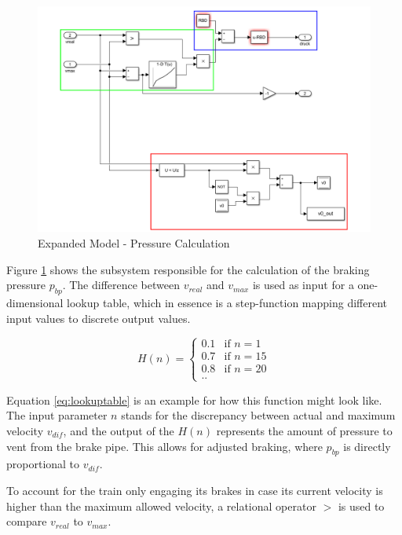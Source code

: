 \begin{figure}[H]
	\centering
	\includegraphics[width=\linewidth]{./pic/expandedmodel_pressure}
	\caption{Expanded Model - Pressure Calculation}
	\label{fig:expandedmodel_pressure}
\end{figure}

\par\noindent
Figure \ref{fig:expandedmodel_pressure} shows the subsystem responsible for the calculation of the braking pressure $p_{bp}$. The difference between $v_{real}$ and $v_{max}$ is used as input for a one-dimensional lookup table, which in essence is a step-function mapping different input values to discrete output values. 

\begin{equation}
\label{eq:lookuptable}
H(n) =
\begin{cases}
0.1 & \text{if $n=1$} \\
0.7 & \text{if $n=15$} \\
0.8 & \text{if $n=20$} \\
\text{..}
\end{cases}
\end{equation}

\noindent
Equation \ref{eq:lookuptable} is an example for how this function might look like. The input parameter $n$ stands for the discrepancy between actual and maximum velocity $v_{dif}$, and the output of the $H(n)$ represents the amount of pressure to vent from the brake pipe. This allows for adjusted braking, where $p_{bp}$ is directly proportional to $v_{dif}$.
\par
To account for the train only engaging its brakes in case its current velocity is higher than the maximum allowed velocity, a relational operator $>$ is used to compare $v_{real}$ to $v_{max}$.

